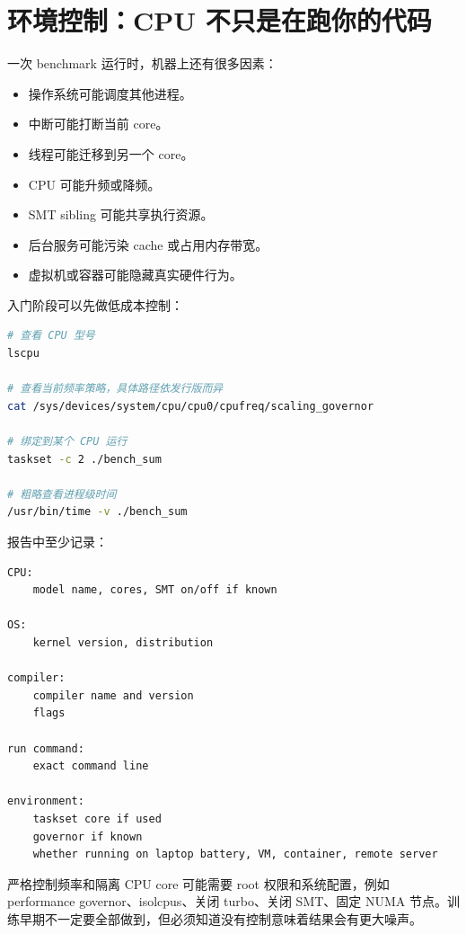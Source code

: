\section{环境控制：CPU 不只是在跑你的代码}

一次 benchmark 运行时，机器上还有很多因素：

\begin{itemize}
  \item 操作系统可能调度其他进程。
  \item 中断可能打断当前 core。
  \item 线程可能迁移到另一个 core。
  \item CPU 可能升频或降频。
  \item SMT sibling 可能共享执行资源。
  \item 后台服务可能污染 cache 或占用内存带宽。
  \item 虚拟机或容器可能隐藏真实硬件行为。
\end{itemize}

入门阶段可以先做低成本控制：

\begin{lstlisting}[language=bash]
# 查看 CPU 型号
lscpu

# 查看当前频率策略，具体路径依发行版而异
cat /sys/devices/system/cpu/cpu0/cpufreq/scaling_governor

# 绑定到某个 CPU 运行
taskset -c 2 ./bench_sum

# 粗略查看进程级时间
/usr/bin/time -v ./bench_sum
\end{lstlisting}

报告中至少记录：

\begin{lstlisting}
CPU:
    model name, cores, SMT on/off if known

OS:
    kernel version, distribution

compiler:
    compiler name and version
    flags

run command:
    exact command line

environment:
    taskset core if used
    governor if known
    whether running on laptop battery, VM, container, remote server
\end{lstlisting}

\begin{deepdive}
严格控制频率和隔离 CPU core 可能需要 root 权限和系统配置，例如 performance governor、isolcpus、关闭 turbo、关闭 SMT、固定 NUMA 节点。训练早期不一定要全部做到，但必须知道没有控制意味着结果会有更大噪声。
\end{deepdive}


